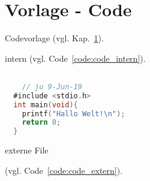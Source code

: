 \section{Vorlage - Code}\label{sec:vorlage_code}

Codevorlage (vgl. Kap.~\ref{sec:vorlage_code}).

intern (vgl. Code~\ref{code:code_intern}).%
\begin{lstlisting}[language=C,caption={Quellcode in C: intern},label={code:code_intern}% C, TeX, Bash, Python
]%--- Code einfügen

	// ju 9-Jun-19
  #include <stdio.h>
  int main(void){
    printf("Hallo Welt!\n");
    return 0;
  }
\end{lstlisting}

externe File \href{file:content/bsp/hallo.c}{}

(vgl. Code~\ref{code:code_extern}).%
